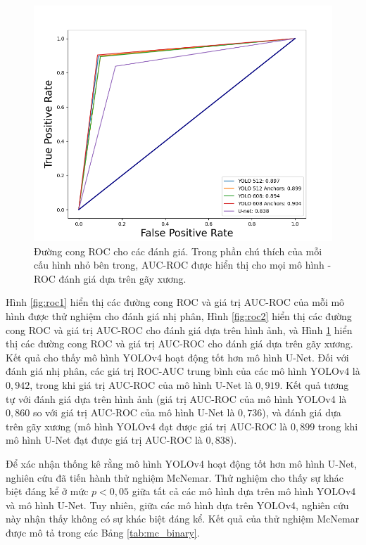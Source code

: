 \documentclass[../the.tex]{subfiles}
\begin{document}
\begin{figure}[ht!]
\centering
	\includegraphics[width=1\textwidth]{images/roc3_new.png}
	\caption{Đường cong ROC cho các đánh giá. Trong phần chú thích của mỗi cấu hình nhỏ bên trong, AUC-ROC được hiển thị cho mọi mô hình - ROC đánh giá dựa trên gãy xương.}
	\label{fig:roc3}
\end{figure}

{\fontsize{13}{12} \selectfont

Hình \ref{fig:roc1} hiển thị các đường cong ROC và giá trị AUC-ROC của mỗi mô hình được thử nghiệm cho đánh giá nhị phân, Hình \ref{fig:roc2} hiển thị các đường cong ROC và giá trị AUC-ROC cho đánh giá dựa trên hình ảnh, và Hình \ref{fig:roc3}  hiển thị các đường cong ROC và giá trị AUC-ROC cho đánh giá dựa trên gãy xương. Kết quả cho thấy mô hình YOLOv4 hoạt động tốt hơn mô hình U-Net. Đối với đánh giá nhị phân, các giá trị ROC-AUC trung bình của các mô hình YOLOv4 là $0,942$, trong khi giá trị AUC-ROC của mô hình U-Net là $0,919$. Kết quả tương tự với đánh giá dựa trên hình ảnh (giá trị AUC-ROC của mô hình YOLOv4 là $0,860$ so với giá trị AUC-ROC của mô hình U-Net là $0,736$), và đánh giá dựa trên gãy xương (mô hình YOLOv4 đạt được giá trị AUC-ROC là $0,899$ trong khi mô hình U-Net đạt được giá trị AUC-ROC là $0,838$).

Để xác nhận thống kê rằng mô hình YOLOv4 hoạt động tốt hơn mô hình U-Net, nghiên cứu đã tiến hành thử nghiệm McNemar. Thử nghiệm cho thấy sự khác biệt đáng kể ở mức $p < 0,05$ giữa tất cả các mô hình dựa trên mô hình YOLOv4 và mô hình U-Net. Tuy nhiên, giữa các mô hình dựa trên YOLOv4, nghiên cứu này nhận thấy không có sự khác biệt đáng kể. Kết quả của thử nghiệm McNemar được mô tả trong các Bảng \ref{tab:mc_binary}.
}
\end{document}
